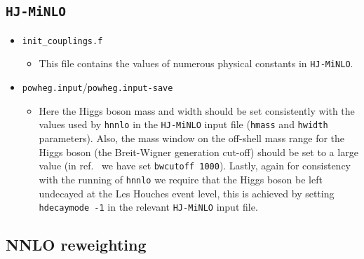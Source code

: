 \documentclass[11pt,a4paper]{article}
\newcommand{\noun}[1]{{\tt #1}}
\newcommand{\HJMINLO}{\noun{HJ-MiNLO}}
\newcommand{\HNNLO}{\noun{hnnlo}}
\begin{document}
\subsection{\HJMINLO{}\label{sec:HJMINLO}}

\begin{itemize}

\item {\tt{init\_couplings.f}}
  \begin{itemize}
  \item This file contains the values of numerous physical constants in
    \HJMINLO{}.
  \end{itemize}

\item {\tt{powheg.input}}/{\tt{powheg.input-save}}
  \begin{itemize}
  \item Here the Higgs boson mass and
    width should be set consistently with the values used by \HNNLO{} in
    the \HJMINLO{} input file ({\tt{hmass}} and {\tt{hwidth}} parameters).
    Also, the mass window on the off-shell mass range for the Higgs boson
    (the Breit-Wigner generation cut-off) should be set to a large value
    (in ref.~\cite{Hamilton:2013fea} we have set {\tt{bwcutoff 1000}}).
    Lastly, again for consistency with the running of \HNNLO{} we require
    that the Higgs boson be left undecayed at the Les Houches event level,
    this is achieved by setting {\tt{hdecaymode -1}} in the relevant
    \HJMINLO{} input file.
  \end{itemize}

\end{itemize}

\subsection{NNLO reweighting\label{sec:HNNLO code}}
\end{document}
